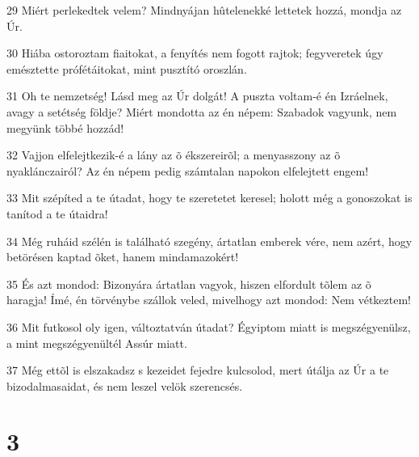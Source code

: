 \par 29 Miért perlekedtek velem? Mindnyájan hûtelenekké lettetek hozzá, mondja az Úr.
\par 30 Hiába ostoroztam fiaitokat, a fenyítés nem fogott rajtok; fegyveretek úgy emésztette prófétáitokat, mint pusztító oroszlán.
\par 31 Oh te nemzetség! Lásd meg az Úr dolgát! A puszta voltam-é én Izráelnek, avagy a setétség földje? Miért mondotta az én népem: Szabadok vagyunk, nem megyünk többé hozzád!
\par 32 Vajjon elfelejtkezik-é a lány az õ ékszereirõl; a menyasszony az õ nyaklánczairól? Az én népem pedig számtalan napokon elfelejtett engem!
\par 33 Mit szépíted a te útadat, hogy te szeretetet keresel; holott még a gonoszokat is tanítod a te útaidra!
\par 34 Még ruháid szélén is található szegény, ártatlan emberek vére, nem azért, hogy betörésen kaptad õket, hanem mindamazokért!
\par 35 És azt mondod: Bizonyára ártatlan vagyok, hiszen elfordult tõlem az õ haragja! Ímé, én törvénybe szállok veled, mivelhogy azt mondod: Nem vétkeztem!
\par 36 Mit futkosol oly igen, változtatván útadat? Égyiptom miatt is megszégyenülsz, a mint megszégyenültél Assúr miatt.
\par 37 Még ettõl is elszakadsz s kezeidet fejedre kulcsolod, mert útálja az Úr a te bizodalmasaidat, és nem leszel velök szerencsés.

\chapter{3}

